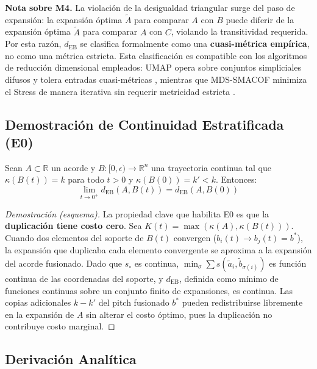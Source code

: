 \textbf{Nota sobre M4.} La violación de la desigualdad triangular surge del paso de expansión: la expansión óptima $\tilde{A}$ para comparar $A$ con $B$ puede diferir de la expansión óptima $\tilde{A}$ para comparar $A$ con $C$, violando la transitividad requerida. Por esta razón, $d_{\text{EB}}$ se clasifica formalmente como una \textbf{cuasi-métrica empírica}, no como una métrica estricta. Esta clasificación es compatible con los algoritmos de reducción dimensional empleados: UMAP opera sobre conjuntos simpliciales difusos y tolera entradas cuasi-métricas \cite{McInnes2018}, mientras que MDS-SMACOF minimiza el Stress de manera iterativa sin requerir metricidad estricta \cite{Borg2005}.

\subsection{Demostración de Continuidad Estratificada (E0)}

\begin{theorem}[E0 para EB]
\label{thm:EB_E0}
Sean $A \subset \mathbb{R}$ un acorde y $B: [0, \epsilon) \to \mathbb{R}^n$ una trayectoria continua tal que $\kappa(B(t)) = k$ para todo $t > 0$ y $\kappa(B(0)) = k' < k$. Entonces:
\begin{equation}
\lim_{t \to 0^+} d_{\text{EB}}(A, B(t)) = d_{\text{EB}}(A, B(0))
\end{equation}
\end{theorem}

\begin{proof}[Demostración (esquema)]
La propiedad clave que habilita E0 es que la \textbf{duplicación tiene costo cero}. Sea $K(t) = \max(\kappa(A), \kappa(B(t)))$. Cuando dos elementos del soporte de $B(t)$ convergen ($b_i(t) \to b_j(t) = b^*$), la expansión que duplicaba cada elemento convergente se aproxima a la expansión del acorde fusionado. Dado que $s_{\circ}$ es continua, $\min_\sigma \sum s(\tilde{a}_i, \tilde{b}_{\sigma(i)})$ es función continua de las coordenadas del soporte, y $d_{\text{EB}}$, definida como mínimo de funciones continuas sobre un conjunto finito de expansiones, es continua. Las copias adicionales $k - k'$ del pitch fusionado $b^*$ pueden redistribuirse libremente en la expansión de $A$ sin alterar el costo óptimo, pues la duplicación no contribuye costo marginal.
\end{proof}

\subsection{Derivación Analítica}

